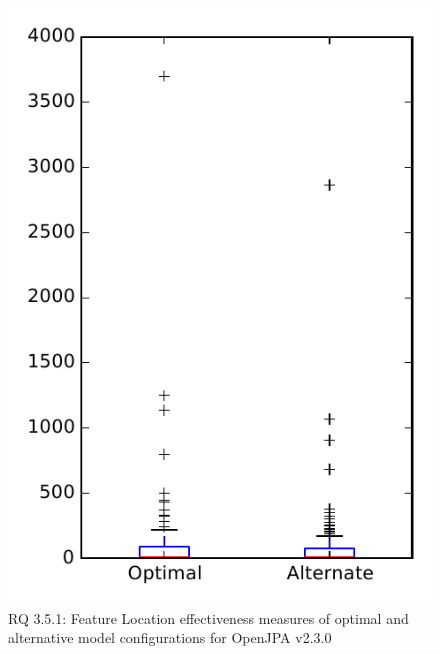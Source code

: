 
\begin{figure}
\centering
\includegraphics[height=0.4\textheight]{figures/combo/flt_rq1_openjpa}
\caption{RQ 3.5.1: Feature Location effectiveness measures of optimal and alternative model configurations for OpenJPA v2.3.0}
\label{fig:combo:flt:rq1:openjpa}
\end{figure}
